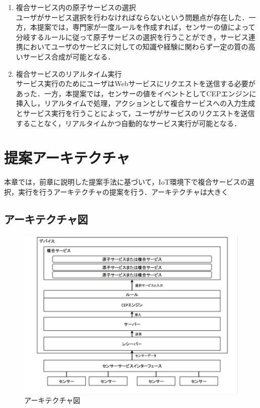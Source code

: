 \documentclass{kuisthesis}			%
\begin{document}
\begin{enumerate}
\item 複合サービス内の原子サービスの選択\\
ユーザがサービス選択を行わなければならないという問題点が存在した．一方，本提案では，専門家が一度ルールを作成すれば，センサーの値によって分岐するルールに従って原子サービスの選択を行うことができ，サービス連携においてユーザのサービスに対しての知識や経験に関わらず一定の質の高いサービス合成が可能となる．
\item 複合サービスのリアルタイム実行\\
サービス実行のためにユーザはWebサービスにリクエストを送信する必要があった．一方，本提案では，センサーの値をイベントとしてCEPエンジンに挿入し，リアルタイムで処理，アクションとして複合サービスへの入力生成とサービス実行を行うことによって，ユーザがサービスのリクエストを送信することなく，リアルタイムかつ自動的なサービス実行が可能となる．
\end{enumerate}

\section{提案アーキテクチャ}
本章では，前章に説明した提案手法に基づいて，IoT環境下で複合サービスの選択，実行を行うアーキテクチャの提案を行う．アーキテクチャは大きく

\subsection{アーキテクチャ図}
\begin{figure}[H]
 \begin{center}
  \includegraphics[width=\linewidth]{pic/architect.png}
  \caption{アーキテクチャ図}
 \end{center}
\end{figure}
\end{document}

